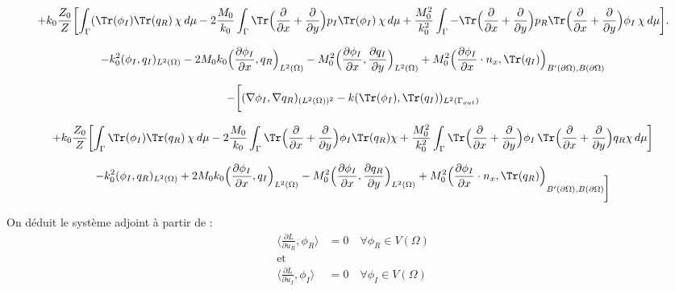\[+ k_0\frac{Z_0}{Z} \biggl[ \int_{\Gamma} (\Tr(\phi_I) \Tr(q_R)\hspace{2pt} \chi \hspace{2pt} d\mu - 2\frac{M_0}{k_0} \int_{\Gamma} \Tr \Bigl( \frac{\partial}{\partial x}+\frac{\partial }{\partial y} \Bigr)p_I \Tr(\phi_I) \hspace{2pt} \chi \hspace{2pt} d\mu + 
\frac{M_0^2}{k_0^2}\int_{\Gamma}  - \Tr \Bigl( \frac{\partial }{\partial x}+\frac{\partial }{\partial y}\Bigr)p_R \Tr\Bigl( \frac{\partial }{\partial x}+\frac{\partial }{\partial y}\Bigr)\phi_I \hspace{2pt} \chi  \hspace{2pt} d\mu \biggl].\]

\[-k_0^2(\phi_I,q_I)_{L^2(\Omega)} -2M_0k_0\Big(\frac{\partial \phi_I}{\partial x}, q_R\Big)_{L^2(\Omega)} 
-M_0^2\Big(\frac{\partial \phi_I}{\partial x},\frac{\partial q_I}{\partial y}\Big)_{L^2(\Omega)}+ M_0^2\Big(\frac{\partial \phi_I}{\partial x}\cdot n_x,\Tr(q_I)\Big)_{B'(\partial \Omega),B(\partial \Omega)}
\]


\[-\biggl[(\nabla \phi_I, \nabla q_R)_{(L^2(\Omega))^2}- k(\Tr(\phi_I),\Tr(q_I))_{L^2(\Gamma_{out})}\]

\[+ k_0\frac{Z_0}{Z} \biggl[ \int_{\Gamma} \Tr(\phi_I) \Tr(q_R) \hspace{2pt} \chi \hspace{2pt} d\mu 
- 2\frac{M_0}{k_0} \int_{\Gamma} \Tr \Bigl( \frac{\partial }{\partial x}+\frac{\partial }{\partial y} \Bigr)\phi_I \Tr(q_R) \chi
+\frac{M_0^2}{k_0^2} \int_{\Gamma} \operatorname{\Tr}\Bigl( \frac{\partial }{\partial x}+\frac{\partial}{\partial y}\Bigr) \phi_I \operatorname{\Tr}\Bigl( \frac{\partial }{\partial x}+\frac{\partial }{\partial y}\Bigr)q_R \chi \, d\mu \biggl]
 \]

\[-k_0^2(\phi_I,q_R)_{L^2(\Omega)}  +2M_0k_0\Big(\frac{\partial \phi_I}{\partial x}, q_I\Big)_{L^2(\Omega)}
-M_0^2\Big(\frac{\partial \phi_I}{\partial x},\frac{\partial q_R}{\partial y}\Big)_{L^2(\Omega)}+ M_0^2\Big(\frac{\partial \phi_I}{\partial x}\cdot n_x,\Tr(q_R)\Big)_{B'(\partial \Omega),B(\partial \Omega) \biggl]}
\]

On déduit le système adjoint à partir de : 
\begin{align}
\langle \frac{\partial L}{\partial u_R}, \phi_R \rangle &= 0 \quad \forall \phi_R \in V(\Omega) \\
\text{et} \\
\langle \frac{\partial L}{\partial u_I}, \phi_I \rangle &= 0 \quad \forall \phi_I \in V(\Omega)
\end{align}

